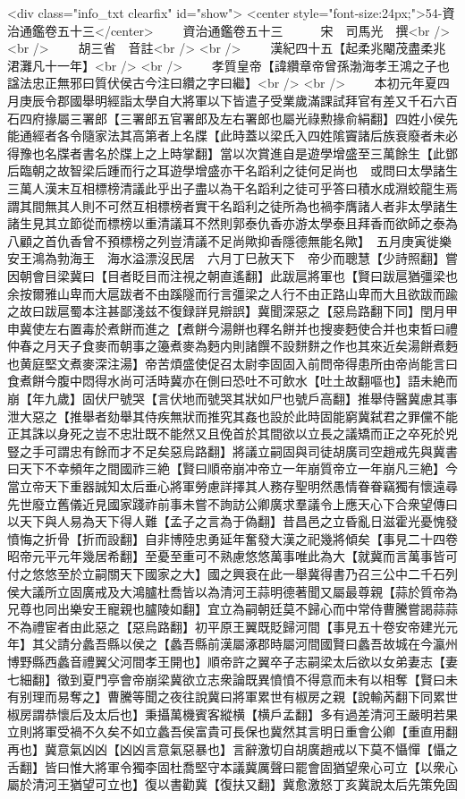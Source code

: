 <div class="info_txt clearfix" id="show">
<center style="font-size:24px;">54-資治通鑑卷五十三</center>
  　　資治通鑑卷五十三　　　宋　司馬光　撰<br />
<br />
　　胡三省　音註<br />
<br />
　　漢紀四十五【起柔兆閹茂盡柔兆涒灘凡十一年】<br />
<br />
　　孝質皇帝【諱纘章帝曾孫渤海孝王鴻之子也諡法忠正無邪曰質伏侯古今注曰纘之字曰繼】<br />
<br />
　　本初元年夏四月庚辰令郡國舉明經詣太學自大將軍以下皆遣子受業歲滿課試拜官有差又千石六百石四府掾屬三署郎【三署郎五官署郎及左右署郎也屬光祿勲掾俞絹翻】四姓小侯先能通經者各令隨家法其高第者上名牒【此時蓋以梁氏入四姓隂竇諸后族衰廢者未必得豫也名牒者書名於牒上之上時掌翻】當以次賞進自是遊學增盛至三萬餘生【此鄧后臨朝之故智梁后踵而行之耳遊學增盛亦干名蹈利之徒何足尚也　或問曰太學諸生三萬人漢末互相標榜清議此乎出子盡以為干名蹈利之徒可乎答曰積水成淵蛟龍生焉謂其間無其人則不可然互相標榜者實干名蹈利之徒所為也禍李膺諸人者非太學諸生諸生見其立節從而標榜以重清議耳不然則郭泰仇香亦游太學泰且拜香而欲師之泰為八顧之首仇香曾不預標榜之列豈清議不足尚歟抑香隱德無能名歟】　五月庚寅徙樂安王鴻為勃海王　海水溢漂沒民居　六月丁巳赦天下　帝少而聰慧【少詩照翻】嘗因朝會目梁冀曰【目者眨目而注視之朝直遙翻】此跋扈將軍也【賢曰跋扈猶彊梁也余按爾雅山卑而大扈跋者不由蹊隧而行言彊梁之人行不由正路山卑而大且欲跋而踰之故曰跋扈蜀本注甚鄙淺兹不復録詳見辯誤】冀聞深惡之【惡烏路翻下同】閏月甲申冀使左右置毒於煮餅而進之【煮餅今湯餅也釋名餅并也搜麥麪使合并也束晳曰禮仲春之月天子食麥而朝事之籩煮麥為麪内則諸饌不設䴵䴵之作也其來近矣湯餅煮麪也黄庭堅文煮麥深注湯】帝苦煩盛使促召太尉李固固入前問帝得患所由帝尚能言曰食煮餅今腹中悶得水尚可活時冀亦在側曰恐吐不可飲水【吐土故翻嘔也】語未絶而崩【年九歲】固伏尸號哭【言伏地而號哭其狀如尸也號戶高翻】推舉侍醫冀慮其事泄大惡之【推舉者劾舉其侍疾無狀而推究其姦也設於此時固能窮冀弑君之罪儻不能正其誅以身死之豈不忠壯既不能然又且俛首於其間欲以立長之議矯而正之卒死於兇豎之手可謂忠有餘而才不足矣惡烏路翻】將議立嗣固與司徒胡廣司空趙戒先與冀書曰天下不幸頻年之間國祚三絶【賢曰順帝崩冲帝立一年崩質帝立一年崩凡三絶】今當立帝天下重器誠知太后垂心將軍勞慮詳擇其人務存聖明然愚情眷眷竊獨有懷遠尋先世廢立舊儀近見國家踐祚前事未嘗不詢訪公卿廣求羣議令上應天心下合衆望傳曰以天下與人易為天下得人難【孟子之言為于偽翻】昔昌邑之立昏亂日滋霍光憂愧發憤悔之折骨【折而設翻】自非博陸忠勇延年奮發大漢之祀幾將傾矣【事見二十四卷昭帝元平元年幾居希翻】至憂至重可不熟慮悠悠萬事唯此為大【就冀而言萬事皆可付之悠悠至於立嗣關天下國家之大】國之興衰在此一舉冀得書乃召三公中二千石列侯大議所立固廣戒及大鴻臚杜喬皆以為清河王蒜明德著聞又屬最尊親【蒜於質帝為兄尊也同出樂安王寵親也臚陵如翻】宜立為嗣朝廷莫不歸心而中常侍曹騰嘗謁蒜蒜不為禮宦者由此惡之【惡烏路翻】初平原王翼既貶歸河間【事見五十卷安帝建光元年】其父請分蠡吾縣以侯之【蠡吾縣前漢屬涿郡時屬河間國賢曰蠡吾故城在今瀛州博野縣西蠡音禮翼父河間孝王開也】順帝許之翼卒子志嗣梁太后欲以女弟妻志【妻七細翻】徵到夏門亭會帝崩梁冀欲立志衆論既異憤憤不得意而未有以相奪【賢曰未有别理而易奪之】曹騰等聞之夜往說冀曰將軍累世有椒房之親【說輸芮翻下同累世椒房謂恭懷后及太后也】秉攝萬機賓客縱横【横戶孟翻】多有過差清河王嚴明若果立則將軍受禍不久矣不如立蠡吾侯富貴可長保也冀然其言明日重會公卿【重直用翻再也】冀意氣凶凶【凶凶言意氣惡暴也】言辭激切自胡廣趙戒以下莫不懾憚【懾之舌翻】皆曰惟大將軍令獨李固杜喬堅守本議冀厲聲曰罷會固猶望衆心可立【以衆心屬於清河王猶望可立也】復以書勸冀【復扶又翻】冀愈激怒丁亥冀說太后先策免固